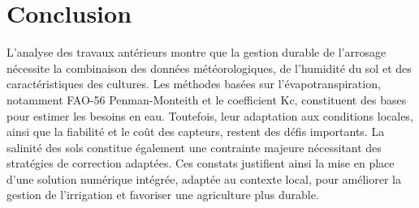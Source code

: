 \section{Conclusion}
L’analyse des travaux antérieurs montre que la gestion durable de l’arrosage nécessite la combinaison des données météorologiques, de l’humidité  du sol et des caractéristiques des cultures. Les méthodes basées sur l'évapotranspiration, notamment FAO-56 Penman-Monteith \cite{allen_crop_1998-1} et le coefficient Kc, constituent des bases pour estimer les besoins en eau. Toutefois, leur adaptation aux conditions locales, ainsi que la fiabilité et le coût des capteurs, restent des défis importants. La salinité des sols constitue également une contrainte majeure nécessitant des stratégies de correction adaptées. Ces constats justifient ainsi la mise en place d’une solution numérique intégrée, adaptée au contexte local, pour améliorer la gestion de l’irrigation et favoriser une agriculture plus durable.